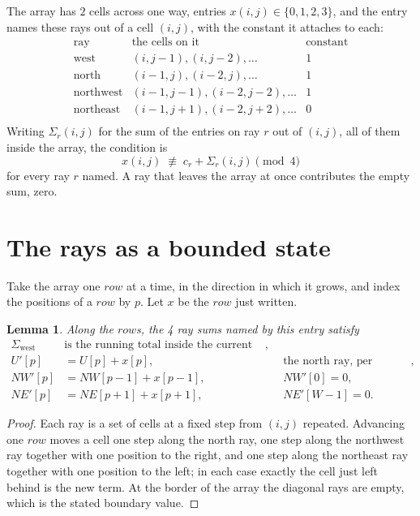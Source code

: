 \documentclass[11pt,a4paper]{article}
\theoremstyle{plain}
\newtheorem{lemma}[theorem]{Lemma}
\theoremstyle{definition}
\begin{document}
The array has $2$ cells across one way, entries $x(i,j)\in\{0,1,2,3\}$, and the entry names these
rays out of a cell $(i,j)$, with the constant it attaches to each:
\[
\begin{array}{lll}
\text{ray} & \text{the cells on it} & \text{constant} \\[2pt]
\text{west} & (i,j-1),(i,j-2),\dots & 1 \\
\text{north} & (i-1,j),(i-2,j),\dots & 1 \\
\text{northwest} & (i-1,j-1),(i-2,j-2),\dots & 1 \\
\text{northeast} & (i-1,j+1),(i-2,j+2),\dots & 0 \\
\end{array}
\]
Writing $\Sigma_r(i,j)$ for the sum of the entries on ray $r$ out of $(i,j)$, all of them
inside the array, the condition is
\[
x(i,j)\;\not\equiv\;c_r+\Sigma_r(i,j) \pmod{4}
\]
for every ray $r$ named. A ray that leaves the array at once contributes the empty sum,
zero.

\section{The rays as a bounded state}

Take the array one $row$ at a time, in the direction in which it grows, and index the
positions of a $row $ by $p$. Let $x$ be the $row$ just written.

\begin{lemma}\label{lem:rays}
Along the $row$s, the 4 ray sums named by this entry satisfy
\[
\begin{aligned}
\Sigma_{\mathrm{west}}\ &\text{is the running total inside the current row},\\
U'[p]&=U[p]+x[p], &&\text{the north ray, per position},\\
NW'[p]&=NW[p-1]+x[p-1], && NW'[0]=0,\\
NE'[p]&=NE[p+1]+x[p+1], && NE'[W-1]=0 .
\end{aligned}
\]
\end{lemma}

\begin{proof}
Each ray is a set of cells at a fixed step from $(i,j)$ repeated. Advancing one $row$
moves a cell one step along the north ray, one step along the northwest ray together with one
position to the right, and one step along the northeast ray together with one position to the
left; in each case exactly the cell just left behind is the new term. At the border of the
array the diagonal rays are empty, which is the stated boundary value.
\end{proof}
\end{document}
